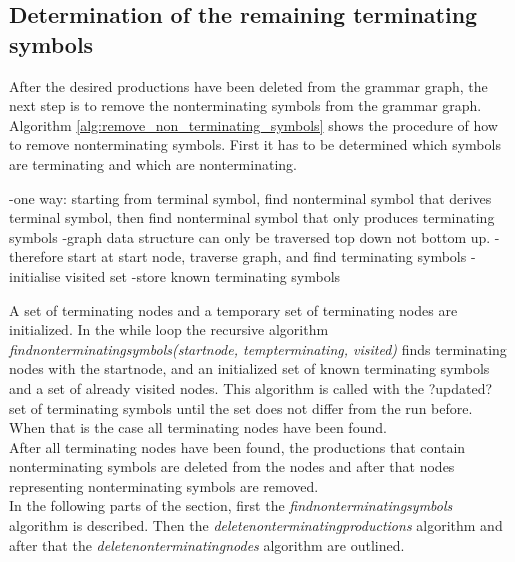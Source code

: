 \subsection{Determination of the remaining terminating symbols}
After the desired productions have been deleted from the grammar graph, the next step is to remove the nonterminating symbols from the grammar graph. Algorithm \ref{alg:remove_non_terminating_symbols} shows the procedure of how to remove nonterminating symbols.
First it has to be determined which symbols are terminating and which are nonterminating.

-one way: starting from terminal symbol, find nonterminal symbol that derives terminal symbol, then find nonterminal symbol that only produces terminating symbols
-graph data structure can only be traversed top down not bottom up.
-therefore start at start node, traverse graph, and find terminating symbols
-initialise visited set
-store known terminating symbols

A set of terminating nodes and a temporary set of terminating nodes are initialized.
In the while loop the recursive algorithm \textit{find\textunderscore non\textunderscore terminating\textunderscore symbols(start\textunderscore node, temp\textunderscore terminating, visited)} finds terminating nodes with the start\textunderscore node, and an initialized set of known terminating symbols and a set of already visited nodes.
This algorithm is called with the ?updated? set of terminating symbols until the set does not differ from the run before.
When that is the case all terminating nodes have been found.\\
After all terminating nodes have been found, the productions that contain nonterminating symbols are deleted from the nodes and after that nodes representing nonterminating symbols are removed.\\

In the following parts of the section, first the \textit{find\textunderscore non\textunderscore terminating\textunderscore symbols} algorithm is described. Then the \textit{delete\textunderscore non\textunderscore terminating\textunderscore productions} algorithm and after that the \textit{delete\textunderscore non\textunderscore terminating\textunderscore nodes} algorithm are outlined.

